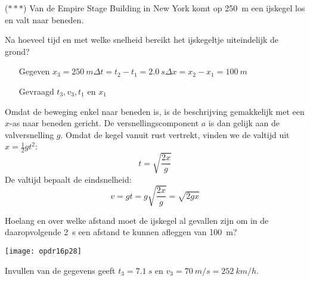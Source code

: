\documentclass{ximera}
\begin{document}
\begin{exercise}
    ($\ast\ast\ast$) Van de Empire Stage Building in New York komt op \SI{250}{m} een ijskegel los en valt naar beneden.
    \begin{question} Na hoeveel tijd en met welke snelheid bereikt het ijskegeltje uiteindelijk de grond?                                                             
        \begin{oplossing}
            \begin{enumerate}
                \item[Gegeven]$x_3=\SI{250}{m}$\newline$\Delta t=t_2-t_1=\SI{2,0}{s}$\newline$\Delta x=x_2-x_1=\SI{100}{m}$
                \item[Gevraagd]$t_3,v_3,t_1$ en $x_1$
            \end{enumerate}
    
            Omdat de beweging enkel naar beneden is, is de beschrijving gemakkelijk met een $x$-as naar beneden gericht. De versnellingscomponent $a$ is dan gelijk aan de valversnelling $g$. Omdat de kegel vanuit rust vertrekt, vinden we de valtijd uit $x=\frac{1}{2}gt^2$:
            \begin{equation*}   
                t=\sqrt{\frac{2x}{g}}
            \end{equation*}
            De valtijd bepaalt de eindsnelheid:
            \begin{equation*}
                v=gt=g\sqrt{\frac{2x}{g}}=\sqrt{2gx}
            \end{equation*}
        
        \end{oplossing}
    \end{question}
    \begin{question} Hoelang en over welke afstand moet de ijskegel al gevallen zijn om in de daaropvolgende \SI{2}{s} een afstand te kunnen afleggen van \SI{100}{m}?
        \begin{oplossing}

            \begin{image}
                \texttt{[image: opdr16p28]}
            \end{image}
            Invullen van de gegevens geeft $t_3=\SI{7,1}{s}$ en $v_3=\SI{70}{m/s}=\SI{252}{km/h}$.
    

\end{oplossing}
\end{question}
\end{exercise}
\end{document}

